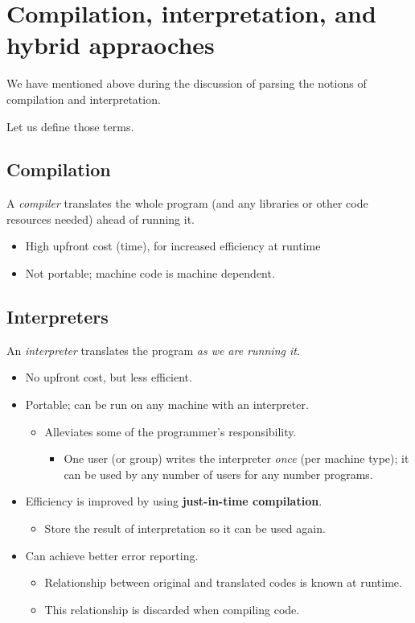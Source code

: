 \documentclass[11pt]{article}
\theoremstyle{definition}
\begin{document}
\section{Compilation, interpretation, and hybrid appraoches}
\label{sec:orga28b807}
We have mentioned above during the discussion of parsing
the notions of compilation and interpretation.

Let us define those terms.

\subsection{Compilation}
\label{sec:orgd5b52d9}
A \emph{compiler} translates the whole program
(and any libraries or other code resources needed)
ahead of running it.
\begin{itemize}
\item High upfront cost (time), for increased efficiency at runtime
\item Not portable; machine code is machine dependent.
\end{itemize}

\subsection{Interpreters}
\label{sec:org35a8fe3}
An \emph{interpreter} translates the program \emph{as we are running it}.
\begin{itemize}
\item No upfront cost, but less efficient.
\item Portable; can be run on any machine with an interpreter.
\begin{itemize}
\item Alleviates some of the programmer's responsibility.
\begin{itemize}
\item One user (or group) writes the interpreter \emph{once}
(per machine type);
it can be used by any number of users for any number programs.
\end{itemize}
\end{itemize}
\item Efficiency is improved by using \textbf{just-in-time compilation}.
\begin{itemize}
\item Store the result of interpretation so it can be used again.
\end{itemize}
\item Can achieve better error reporting.
\begin{itemize}
\item Relationship between original and translated codes is known at runtime.
\item This relationship is discarded when compiling code.
\end{itemize}
\end{itemize}
\end{document}
